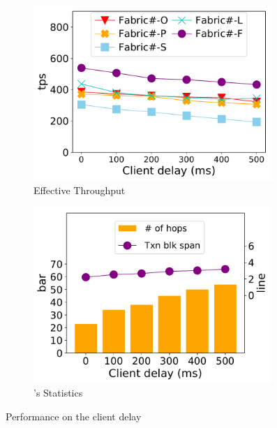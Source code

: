 \begin{figure}[t]
	\centering
    \begin{subfigure}{0.45\textwidth}
      \includegraphics[width=0.99\textwidth]{chart/txn/complex_clientdelay_thruput.pdf}
      \caption{Effective Throughput}
      \label{chart:txn:clientdelay:thruput}
    \end{subfigure}
    \begin{subfigure}{0.45\textwidth}
      \includegraphics[width=0.99\textwidth]{chart/txn/complex_clientdelay_stats.pdf}
      \caption{{\fsF}'s Statistics}
      \label{chart:txn:clientdelay:stat}
    \end{subfigure}
    \caption{Performance on the client delay}
    \label{chart:txn:clientdelay}
\end{figure}

